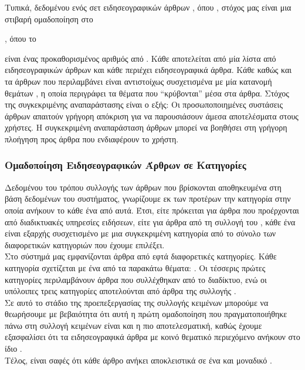 {{{{Τυπικά, δεδομένου ενός σετ ειδησεογραφικών άρθρων {}, 
όπου {}, στόχος μας είναι μια στιβαρή ομαδοποίηση {} στο {, όπου το { είναι ένας προκαθορισμένος 
αριθμός από {}. Κάθε {} {} αποτελείται από μία λίστα από {} 
ειδησεογραφικών άρθρων {} και κάθε {} {} 
περιέχει {} ειδησεογραφικά άρθρα. 
Κάθε {} καθώς και τα {} άρθρων που περιλαμβάνει είναι αντιστοίχως συσχετισμένα 
με μία κατανομή θεμάτων {}, η οποία περιγράφει τα θέματα που “κρύβονται” μέσα στα άρθρα. 
Στόχος της συγκεκριμένης αναπαράστασης είναι ο εξής: 
Οι προσωποποιημένες συστάσεις άρθρων απαιτούν γρήγορη απόκριση για να παρουσιάσουν 
άμεσα αποτελέσματα στους χρήστες. Η συγκεκριμένη αναπαράσταση άρθρων μπορεί να βοηθήσει 
στη γρήγορη πλοήγηση προς άρθρα που ενδιαφέρουν το χρήστη. 

\subsubsection{Ομαδοποίηση Ειδησεογραφικών Άρθρων σε Κατηγορίες {}}

Δεδομένου του τρόπου συλλογής των άρθρων που βρίσκονται αποθηκευμένα στη βάση δεδομένων του συστήματος, 
γνωρίζουμε εκ των προτέρων την κατηγορία στην οποία ανήκουν το κάθε ένα από αυτά. 
Έτσι, είτε πρόκειται για άρθρα που προέρχονται από διαδικτυακές υπηρεσίες ειδήσεων, 
είτε για άρθρα από τη συλλογή {} του {}, κάθε ένα είναι εξαρχής συσχετισμένο 
με μια συγκεκριμένη κατηγορία από το σύνολο των διαφορετικών κατηγοριών που έχουμε επιλέξει. \\
Στο σύστημά μας εμφανίζονται άρθρα από εφτά διαφορετικές κατηγορίες. 
Κάθε κατηγορία σχετίζεται με ένα από τα παρακάτω θέματα: 
\textit{{}}. 
Οι τέσσερις πρώτες κατηγορίες περιλαμβάνουν άρθρα που συλλέχθηκαν από το διαδίκτυο, 
ενώ οι υπόλοιπες τρεις κατηγορίες αποτελούνται από άρθρα της συλλογής {}.\\
Σε αυτό το στάδιο της προεπεξεργασίας της συλλογής κειμένων μπορούμε να θεωρήσουμε με βεβαιότητα 
ότι αυτή η πρώτη ομαδοποίηση που πραγματοποιήθηκε πάνω στη συλλογή κειμένων είναι και η πιο αποτελεσματική, 
καθώς έχουμε εξασφαλίσει ότι τα ειδησεογραφικά άρθρα με κοινό θεματικό περιεχόμενο ανήκουν στο ίδιο {}. \\
Τέλος, είναι σαφές ότι κάθε άρθρο ανήκει αποκλειστικά σε ένα και μοναδικό {}. 
\\

}}}}}}

